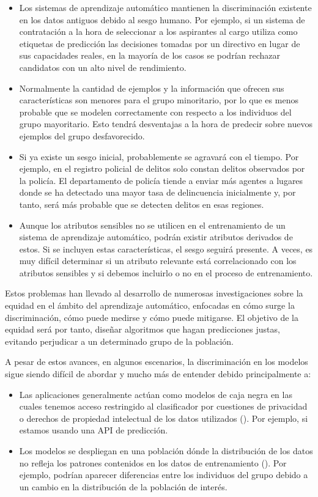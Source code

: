 \documentclass[oneside,openright,titlepage,numbers=noenddot,openany,headinclude,footinclude=true,
cleardoublepage=empty,abstractoff,BCOR=5mm,paper=a4,fontsize=12pt,main=spanish]{scrreprt}
\begin{document}
\begin{itemize}
    \item Los sistemas de aprendizaje automático mantienen la discriminación existente en los datos antiguos debido al sesgo humano. Por ejemplo, si un sistema de contratación a la hora de seleccionar a los aspirantes al cargo utiliza como etiquetas de predicción las decisiones tomadas por un directivo en lugar de sus capacidades reales, en la mayoría de los casos se podrían rechazar candidatos con un alto nivel de rendimiento.
    \item Normalmente la cantidad de ejemplos y la información que ofrecen sus características son menores para el grupo minoritario, por lo que es menos probable que se modelen correctamente con respecto a los individuos del grupo mayoritario. Esto tendrá desventajas a la hora de predecir sobre nuevos ejemplos del grupo desfavorecido.
    \item Si ya existe un sesgo inicial, probablemente se agravará con el tiempo. Por ejemplo, en el registro policial de delitos solo constan delitos observados por la policía. El departamento de policía tiende a enviar más agentes a lugares donde se ha detectado una mayor tasa de delincuencia inicialmente y, por tanto, será más probable que se detecten delitos en esas regiones. 
    \item Aunque los atributos sensibles no se utilicen en el entrenamiento de un sistema de aprendizaje automático, podrán existir atributos derivados de estos. Si se incluyen estas características, el sesgo seguirá presente. A veces, es muy difícil determinar si un atributo relevante está correlacionado con los atributos sensibles y si debemos incluirlo o no en el proceso de entrenamiento.
\end{itemize}

Estos problemas han llevado al desarrollo de numerosas investigaciones sobre la equidad en el ámbito del aprendizaje automático, enfocadas en cómo surge la discriminación, cómo puede medirse y cómo puede mitigarse. El objetivo de la equidad será por tanto, diseñar algoritmos que hagan predicciones justas, evitando perjudicar a un determinado grupo de la población.

A pesar de estos avances, en algunos escenarios, la discriminación en los modelos sigue siendo difícil de abordar y mucho más de entender debido principalmente a: 

\begin{itemize}
    \item Las aplicaciones generalmente actúan como modelos de caja negra en las cuales tenemos acceso restringido al clasificador por cuestiones de privacidad o derechos de propiedad intelectual de los datos utilizados (\cite{blackbox2014}). Por ejemplo, si estamos usando una API de predicción.
	\item Los modelos se despliegan en una población dónde la distribución de los datos no refleja los patrones contenidos en los datos de entrenamiento (\cite{distributionmodel2017}). Por ejemplo, podrían aparecer diferencias entre los individuos del grupo debido a un cambio en la distribución de la población de interés.
\end{itemize}
\end{document}
